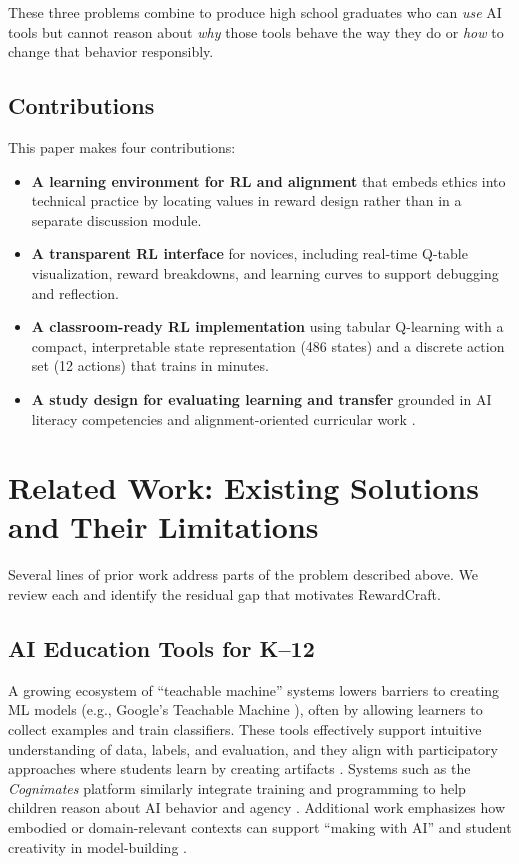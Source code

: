 \documentclass[conference]{IEEEtran}
\begin{document}
\noindent These three problems combine to produce high school graduates who can \emph{use} AI tools but cannot reason about \emph{why} those tools behave the way they do or \emph{how} to change that behavior responsibly.

\subsection{Contributions}
This paper makes four contributions:

\begin{itemize}
  \item \textbf{A learning environment for RL and alignment} that embeds ethics into technical practice by locating values in reward design rather than in a separate discussion module.
  \item \textbf{A transparent RL interface} for novices, including real-time Q-table visualization, reward breakdowns, and learning curves to support debugging and reflection.
  \item \textbf{A classroom-ready RL implementation} using tabular Q-learning with a compact, interpretable state representation (486 states) and a discrete action set (12 actions) that trains in minutes.
  \item \textbf{A study design for evaluating learning and transfer} grounded in AI literacy competencies \cite{long2020} and alignment-oriented curricular work \cite{williams2022}.
\end{itemize}

\section{Related Work: Existing Solutions and Their Limitations}
Several lines of prior work address parts of the problem described above. We review each and identify the residual gap that motivates RewardCraft.

\subsection{AI Education Tools for K--12}
A growing ecosystem of “teachable machine” systems lowers barriers to creating ML models (e.g., Google’s Teachable Machine \cite{carney2020}), often by allowing learners to collect examples and train classifiers. These tools effectively support intuitive understanding of data, labels, and evaluation, and they align with participatory approaches where students learn by creating artifacts \cite{vartiainen2021,dwivedi2021}. Systems such as the \emph{Cognimates} platform similarly integrate training and programming to help children reason about AI behavior and agency \cite{druga2021}. Additional work emphasizes how embodied or domain-relevant contexts can support “making with AI” and student creativity in model-building \cite{zimmermann2019}.
\end{document}
